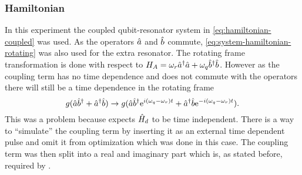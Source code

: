 \documentclass[main.tex]{subfiles}
\begin{document}
\subsubsection{Hamiltonian}
In this experiment the coupled qubit-resonator system in \cref{eq:hamiltonian-coupled} was used.
As the operators \(\hat{a}\) and \(\hat{b}\) commute, \cref{eq:system-hamiltonian-rotating} was also used for the extra resonator.
The rotating frame transformation is done with respect to \( H_A = \omega_{r} \hat{a}^\dagger\hat{a} + \omega_{q} \hat{b}^\dagger\hat{b} \).
However as the coupling term has no time dependence and does not commute with the operators there will still be a time dependence in the rotating frame
\begin{equation}
    g(\hat{a}\hat{b}^\dagger + \hat{a}^\dagger\hat{b}) \rightarrow g(\hat{a}\hat{b}^\dagger\mathrm{e}^{i(\omega_q-\omega_r)t} + \hat{a}^\dagger\hat{b}\mathrm{e}^{-i(\omega_q-\omega_r)t}).
\end{equation}
This was a problem because \krotov{} expects \(\hat{H}_d\) to be time independent.
There is a way to ``simulate'' the coupling term by inserting it as an external time dependent pulse and omit it from optimization which was done in this case.
The coupling term was then split into a real and imaginary part which is, as stated before, required by \krotov{}.
\end{document}
